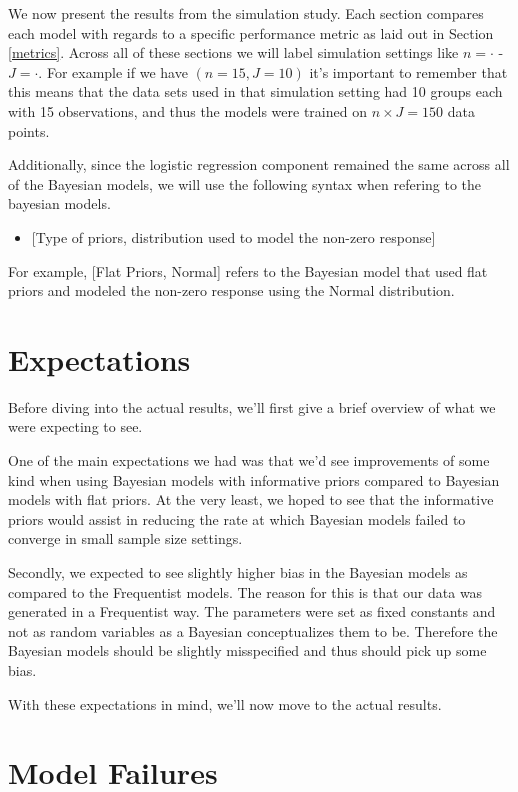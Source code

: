 \documentclass[12pt,twoside]{reedthesis}
\providecommand{\tightlist}{%
  \setlength{\itemsep}{0pt}\setlength{\parskip}{0pt}}
\begin{document}
We now present the results from the simulation study. Each section compares each model with regards to a specific performance metric as laid out in Section \ref{metrics}. Across all of these sections we will label simulation settings like \(n = \cdot\) - \(J = \cdot\). For example if we have \((n = 15, J = 10 )\) it's important to remember that this means that the data sets used in that simulation setting had 10 groups each with 15 observations, and thus the models were trained on \(n\times J = 150\) data points.

Additionally, since the logistic regression component remained the same across all of the Bayesian models, we will use the following syntax when refering to the bayesian models.
\begin{itemize}
\tightlist
\item
  {[}Type of priors, distribution used to model the non-zero response{]}
\end{itemize}
For example, {[}Flat Priors, Normal{]} refers to the Bayesian model that used flat priors and modeled the non-zero response using the Normal distribution.

\hypertarget{expectations}{%
\section{Expectations}\label{expectations}}

Before diving into the actual results, we'll first give a brief overview of what we were expecting to see.

One of the main expectations we had was that we'd see improvements of some kind when using Bayesian models with informative priors compared to Bayesian models with flat priors. At the very least, we hoped to see that the informative priors would assist in reducing the rate at which Bayesian models failed to converge in small sample size settings.

Secondly, we expected to see slightly higher bias in the Bayesian models as compared to the Frequentist models. The reason for this is that our data was generated in a Frequentist way. The parameters were set as fixed constants and not as random variables as a Bayesian conceptualizes them to be. Therefore the Bayesian models should be slightly misspecified and thus should pick up some bias.

With these expectations in mind, we'll now move to the actual results.

\hypertarget{model-failures}{%
\section{Model Failures}\label{model-failures}}
\end{document}
